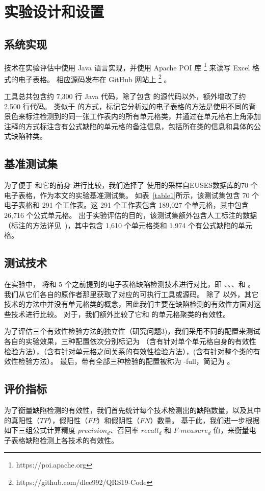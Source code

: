 \section{实验设计和设置}


\subsection{系统实现}
\wa 技术在实验评估中使用 Java 语言实现，并使用 Apache POI 库 \footnote{https://poi.apache.org} 来读写 Excel 格式的电子表格。
相应源码发布在 GitHub 网站上 \footnote{https://github.com/dlee992/QRS19-Code} 。

\wa 工具总共包含约 7,300 行 Java 代码，除了包含 \cu 的源代码以外，额外增改了约 2,500 行代码。
类似于 \cu 的方式，\wa 标记它分析过的电子表格的方法是使用不同的背景色来标注检测到的同一张工作表内的所有单元格类，并通过在单元格右上角添加注释的方式标注含有公式缺陷的单元格的备注信息，包括所在类的信息和具体的公式缺陷种类。

\subsection{基准测试集} 
为了便于 \wa 和它的前身 \cu 进行比较，我们选择了 \cu 使用的采样自EUSES数据库的70 个电子表格，作为本文的实验基准测试集。
如表~\ref{table1}所示，该测试集包含 70 个电子表格和 291 个工作表。这 291 个工作表包含 189,027 个单元格，其中包含 26,716 个公式单元格。
出于实验评估的目的，该测试集额外包含人工标注的数据（标注的方法详见~\cite{cheung2016custodes})，其中包含 1,610 个单元格类和 1,974 个有公式缺陷的单元格。

\subsection{测试技术} 
在实验中， \wa 将和 5 个之前提到的电子表格缺陷检测技术进行对比，即 \uc、\di、\am、\ca 和 \cu 。
我们从它们各自的原作者那里获取了对应的可执行工具或源码。
除了 \ca 以外，其它技术的方法中并没有单元格类的概念，因此我们主要在缺陷检测的有效性方面对这些技术进行比较。
对于\ca，我们额外比较了它和 \wa 的单元格聚类的有效性。

为了评估三个有效性检验方法的独立性（研究问题3)，我们采用不同的配置来测试各自的实验效果，三种配置依次分别标记为 \wasc （含有针对单个单元格自身的有效性检验方法），\wamc （含有针对单元格之间关系的有效性检验方法），\wawc (含有针对整个类的有效性检验方法）。
最后，带有全部三种检验的配置被称为 \wa-full，简记为 \wa 。

\subsection{评价指标} 
为了衡量缺陷检测的有效性，我们首先统计每个技术检测出的缺陷数量，以及其中的真阳性（$TP$），假阳性（$FP$）和假阴性（$FN$）数量。
基于此，我们进一步根据如下三组公式计算精度 $precision_d$、召回率 $recall_d$ 和 $F\text{-}measure_d$ 值\cite{yoshida2010person}，来衡量电子表格缺陷检测上各技术的有效性。

